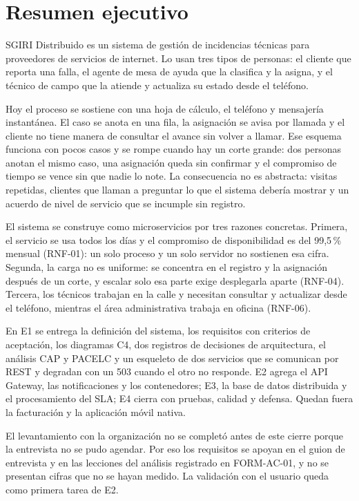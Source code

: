 ﻿\section{Resumen ejecutivo}

SGIRI Distribuido es un sistema de gestión de incidencias técnicas para proveedores de servicios de
internet. Lo usan tres tipos de personas: el cliente que reporta una falla, el agente de mesa de
ayuda que la clasifica y la asigna, y el técnico de campo que la atiende y actualiza su estado desde
el teléfono.

Hoy el proceso se sostiene con una hoja de cálculo, el teléfono y mensajería instantánea. El caso se
anota en una fila, la asignación se avisa por llamada y el cliente no tiene manera de consultar el
avance sin volver a llamar. Ese esquema funciona con pocos casos y se rompe cuando hay un corte
grande: dos personas anotan el mismo caso, una asignación queda sin confirmar y el compromiso de
tiempo se vence sin que nadie lo note. La consecuencia no es abstracta: visitas repetidas, clientes
que llaman a preguntar lo que el sistema debería mostrar y un acuerdo de nivel de servicio que se
incumple sin registro.

El sistema se construye como microservicios por tres razones concretas.
Primera, el servicio se usa todos los días y el compromiso de disponibilidad es del 99,5\,\% mensual
(RNF-01): un solo proceso y un solo servidor no sostienen esa cifra. Segunda, la carga no es
uniforme: se concentra en el registro y la asignación después de un corte, y escalar solo esa parte
exige desplegarla aparte (RNF-04). Tercera, los técnicos trabajan en la calle y necesitan consultar y
actualizar desde el teléfono, mientras el área administrativa trabaja en oficina (RNF-06).

En E1 se entrega la definición del sistema, los requisitos con criterios de aceptación, los diagramas
C4, dos registros de decisiones de arquitectura, el análisis CAP y PACELC y un esqueleto de dos
servicios que se comunican por REST y degradan con un 503 cuando el otro no responde. E2 agrega el
API Gateway, las notificaciones y los contenedores; E3, la base de datos distribuida y el
procesamiento del SLA; E4 cierra con pruebas, calidad y defensa. Quedan fuera la facturación y la aplicación móvil nativa.

El levantamiento con la organización no se completó antes de este cierre porque la entrevista no se
pudo agendar. Por eso los requisitos se apoyan en el guion de entrevista y en las lecciones del
análisis registrado en FORM-AC-01, y no se presentan cifras que no se hayan medido. La validación con
el usuario queda como primera tarea de E2.

